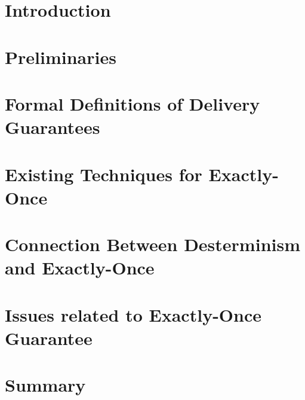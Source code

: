 \section{Introduction}

\section{Preliminaries}

\section{Formal Definitions of Delivery Guarantees}

\section{Existing Techniques for Exactly-Once}

\section{Connection Between Desterminism and Exactly-Once}

\section{Issues related to Exactly-Once Guarantee}

\section{Summary}